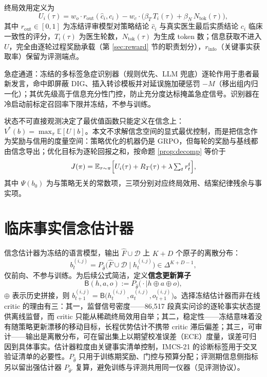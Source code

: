 \documentclass[11pt,a4paper]{ctexart}
\newcommand{\E}{\mathbb{E}}
\newcommand{\1}[1]{\mathbb{1}\!\left[#1\right]}
\newcommand{\Fhat}{\hat{F}}
\newcommand{\Dcal}{\mathcal{D}}
\newcommand{\Bupd}{\mathsf{B}}
\begin{document}
终局效用定义为
\begin{equation}\label{eq:utility}
U_i(\tau)=w_o\cdot r_{\mathrm{out}}(\hat c_i,c_i)
-w_c\cdot\bigl(\beta_T\,T_i(\tau)+\beta_N\,N_{\mathrm{tok}}(\tau)\bigr),
\end{equation}
其中 $r_{\mathrm{out}}\in[0,1]$ 为冻结评审模型对策略结论 $\hat c_i$ 与真实医生最后实质结论 $c_i$ 临床一致性的评分，$T_i(\tau)$ 为医生轮数，$N_{\mathrm{tok}}(\tau)$ 为生成 token 数；信息获取不进入 $U$，完全由逐轮过程奖励承载（第 \ref{sec:reward} 节的职责划分），$r_{\mathrm{info}}$（关键事实获取率）保留为评测端点。

急症通道：冻结的多标签急症识别器（规则优先、LLM 兜底）逐轮作用于患者最新发言，命中即屏蔽 $\mathrm{DIG}$、插入转诊模板并对延误施加硬惩罚 $-M$（移出组内归一化）；其优先级高于信息充分性门控，防止充分度达标掩盖急症信号。识别器在冷启动前标定召回率下限并冻结，不参与训练。

状态不可直接观测决定了最优值函数只能定义在信念上：$V^\ast(b)=\max_\pi \E[U\mid b]$。本文不求解信念空间的显式最优控制，而是把信念作为奖励与信用的度量空间：策略优化的机器仍是 GRPO，但每轮的奖励与基线都由信念导出；优化目标为逐轮回报之和，按命题 \ref{prop:decomp} 等价于
\begin{equation}\label{eq:objective-j}
J(\pi)=\E_{\tau\sim\pi}\Bigl[U_i(\tau)+R_T(\tau)+\lambda\textstyle\sum_{t} r_t^{\mathrm{f}}\Bigr],
\end{equation}
其中 $\Psi(b_0)$ 为与策略无关的常数项，三项分别对应终局效用、结案纪律残余与事实项。

\section{临床事实信念估计器}
信念估计器为冻结的语言模型，输出 $\Fhat\cup\Dcal$ 上 $K+D$ 个原子的离散分布：
\begin{equation}\label{eq:estimator}
b_t^{(i,j)}=P_{\hat\theta}\bigl(\Fhat\cup\Dcal \mid h_t^{(i,j)}\bigr)\in\Delta^{K+D-1},
\end{equation}
仅前向、不参与训练。为后续公式简洁，定义\textbf{信念更新算子}
\begin{equation}\label{eq:belief-update}
\Bupd(h,a,o):=P_{\hat\theta}\bigl(\cdot\mid h\oplus a\oplus o\bigr),
\end{equation}
$\oplus$ 表示历史拼接，则 $b_{t+1}^{(i,j)}=\Bupd\bigl(h_t^{(i,j)},a_t^{(i,j)},o_{t+1}^{(i,j)}\bigr)$。选择冻结估计器而非在线 critic 的理由有三：其一，监督信号密度——86{,}517 段真实问诊的逐轮事实状态提供离线监督，而 critic 只能从稀疏终局效用自举；其二，稳定性——冻结意味着没有随策略更新漂移的移动目标，长程优势估计不携带 critic 滞后偏差；其三，可审计——输出是离散分布，可在留出集上以期望校准误差（ECE）度量，误差可归因到具体事实。估计器粒度由关键事实清单控制，IMCS-21 的诊断标签用于交叉验证清单的必要性。$P_{\hat\theta}$ 只用于训练期奖励、门控与预算分配；评测期信息侧指标另以留出强估计器 $P_{\hat\theta'}$ 复算，避免训练与评测共用同一仪器（见评测协议）。
\end{document}
